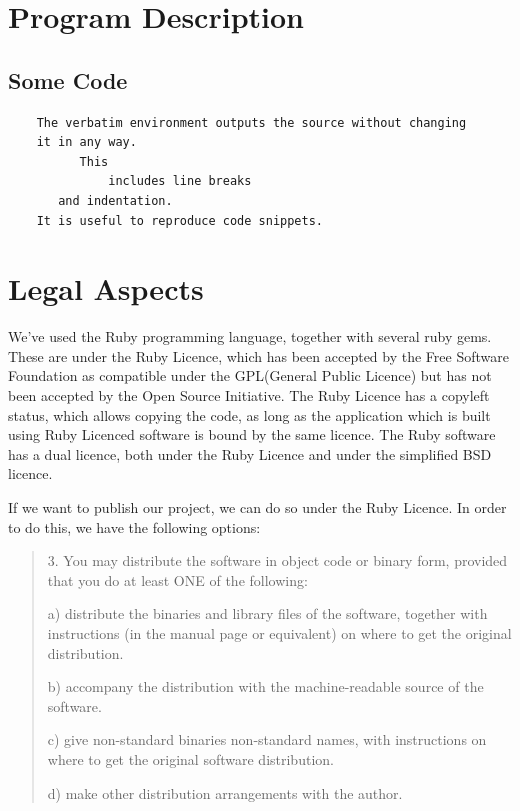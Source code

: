 \documentclass[a4wide, 11pt]{article}
\begin{document}
\section{Program Description}
\subsection{Some Code} 

\begin{verbatim}
    The verbatim environment outputs the source without changing
    it in any way. 
          This
              includes line breaks
       and indentation. 
    It is useful to reproduce code snippets.
\end{verbatim}
\clearpage

\section{Legal Aspects}

We've used the Ruby programming language, together with several ruby gems.
These are under the Ruby Licence, which has been accepted by the Free Software
Foundation as compatible under the GPL(General Public Licence)\cite{GNUlicence}
but has not been accepted by the Open Source Initiative. The Ruby Licence has a
copyleft status, which allows copying the code, as long as the application
which is built using Ruby Licenced software is bound by the same licence. The
Ruby software has a dual licence, both under the Ruby Licence and under the
simplified BSD licence.

If we want to publish our project, we can do so under the Ruby Licence.
In order to do this, we have the following options:

\begin{quote}
3. You may distribute the software in object code or binary form,
   provided that you do at least ONE of the following:

a) distribute the binaries and library files of the software,
together with instructions (in the manual page or equivalent)
on where to get the original distribution.

b) accompany the distribution with the machine-readable source of
the software.

c) give non-standard binaries non-standard names, with
instructions on where to get the original software distribution.

d) make other distribution arrangements with the author.
     \cite{Rubylicence}
\end{quote}
\end{document}
